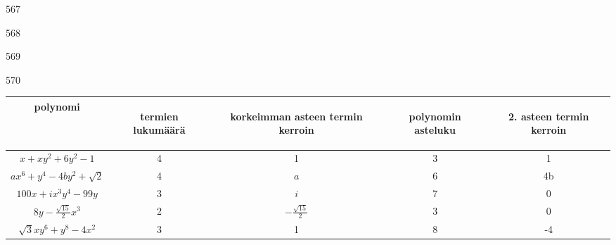 \begin{Vastaus}{567}
    
\end{Vastaus}
\begin{Vastaus}{568}
	
\end{Vastaus}
\begin{Vastaus}{569}
    
\end{Vastaus}
\begin{Vastaus}{570}
    \begin{footnotesize}
    \begin{tabular}{|c|c|c|c|c|}
                                                                         \hline
polynomi
& \begin{sideways}termien lukumäärä\end{sideways}%
& \begin{sideways}korkeimman asteen termin kerroin\end{sideways}%
& \begin{sideways}polynomin asteluku\end{sideways}%
& \begin{sideways}2. asteen termin kerroin\end{sideways} \\ \hline
$ x+xy^2+6y^2-1$ 		&      4  &         1      &       3   &    1       \\ \hline
$ ax^6+y^4-4by^2+\sqrt{2}$  	&     4    &    $a$       &    6   &     4b       \\ \hline
$ 100x+ ix^3y^4-99y$          	&    3     &      $i$    &     7     &    0       \\ \hline
$ 8y-\frac{\sqrt{15}}{2}x^3$	 &     2     &    $-\frac{\sqrt{15}}{2}$    &     3    &    0   \\ \hline
$ \sqrt{3}xy^6 + y^8 - 4x^2$ 	&   3       &         1        &    8      &     -4       \\ \hline
    \end{tabular}
    \end{footnotesize}
     
\end{Vastaus}
